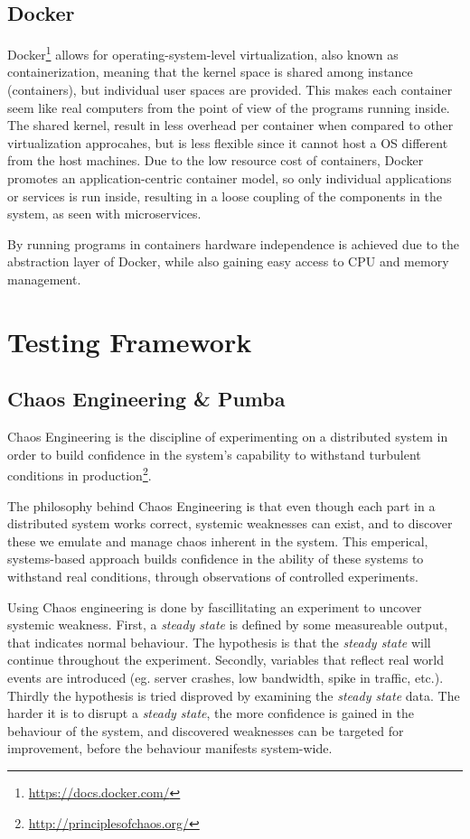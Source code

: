 \subsection{Docker}
Docker\footnote{\url{https://docs.docker.com/}} allows for operating-system-level virtualization, also known as containerization, meaning that the kernel space is shared among instance (containers), but individual user spaces are provided. This makes each container seem like real computers from the point of view of the programs running inside. 
The shared kernel, result in less overhead per container when compared to other virtualization approcahes, but is less flexible since it cannot host a \acs{OS} different from the host machines. Due to the low resource cost of containers, Docker promotes an application-centric container model\cite{merkel2014docker}, so only individual applications or services is run inside, resulting in a loose coupling of the components in the system, as seen with microservices. 

By running programs in containers hardware independence is achieved due to the abstraction layer of Docker, while also gaining easy access to CPU and memory management.

\section{Testing Framework}
\subsection{Chaos Engineering \& Pumba}
\label{sec:framework_pumba}
Chaos Engineering is the discipline of experimenting on a distributed system in order to build confidence in the system’s capability to withstand turbulent conditions in production\footnote{\url{http://principlesofchaos.org/}}.

The philosophy behind Chaos Engineering is that even though each part in a distributed system works correct, systemic weaknesses can exist, and to discover these we emulate and manage chaos inherent in the system. This emperical, systems-based approach builds confidence in the ability of these systems to withstand real conditions, through observations of controlled experiments.

Using Chaos engineering is done by fascillitating an experiment to uncover systemic weakness.
First, a \emph{steady state} is defined by some measureable output, that indicates normal behaviour. The hypothesis is that the \emph{steady state} will continue throughout the experiment.
Secondly, variables that reflect real world events are introduced (eg. server crashes, low bandwidth, spike in traffic, etc.).
Thirdly the hypothesis is tried disproved by examining the \emph{steady state} data.
The harder it is to disrupt a \emph{steady state}, the more confidence is gained in the behaviour of the system, and discovered weaknesses can be targeted for improvement, before the behaviour manifests system-wide.

